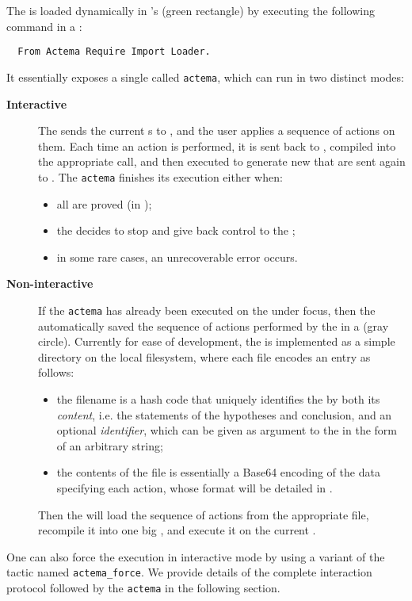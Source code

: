 The  is loaded dynamically in 's  (green
rectangle) by executing the following command in a :
\begin{verbatim}
  From Actema Require Import Loader.
\end{verbatim}
It essentially exposes a single  called \texttt{actema}, which can run in
two distinct modes:
\begin{description}
  \item[\bfseries Interactive] The  sends the current s
  to , and the user applies a sequence of actions on them. Each time an
  action is performed, it is sent back to , compiled into the appropriate
   call, and then executed to generate new  that are sent again to
  . The \texttt{actema}  finishes its execution either when:
  \begin{itemize}
    \item all  are proved (in );
    \item the  decides to stop and give back control to the
    ;
    \item in some rare cases, an unrecoverable error occurs.
  \end{itemize}

  \item[\bfseries Non-interactive] If the \texttt{actema}  has already
  been executed on the  under focus, then the 
  automatically saved the sequence of actions performed by the  in
  a  (gray circle). Currently for ease of development, the
   is implemented as a simple directory on the local
  filesystem, where each file encodes an entry as follows:
  \begin{itemize}
    \item the filename is a hash code that uniquely identifies the  by both
    its \emph{content}, i.e. the statements of the hypotheses and conclusion,
    and an optional \emph{identifier}, which can be given as argument to the
     in the form of an arbitrary string;
    \item the contents of the file is essentially a Base64 encoding of the data
    specifying each action, whose format will be detailed in
    .
  \end{itemize}
  Then the  will load the sequence of actions from the appropriate file,
  recompile it into one big , and execute it on the current .
\end{description}
One can also force the execution in interactive mode by using a variant of the
tactic named \texttt{actema\_force}. We provide details of the complete
interaction protocol followed by the \texttt{actema}  in the following
section.

